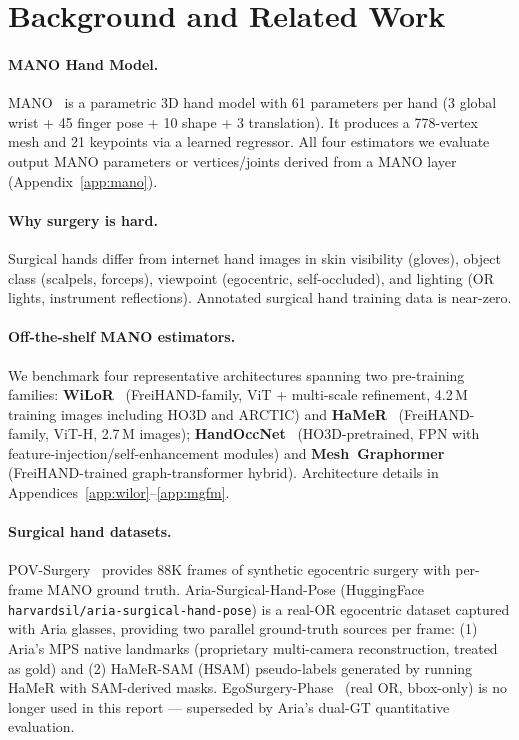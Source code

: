 \documentclass{article}
\begin{document}
\section{Background and Related Work}
\label{sec:background}

\paragraph{MANO Hand Model.}
MANO~\cite{romero2017mano} is a parametric 3D hand model with 61 parameters per hand (3 global wrist + 45 finger pose + 10 shape + 3 translation). It produces a 778-vertex mesh and 21 keypoints via a learned regressor. All four estimators we evaluate output MANO parameters or vertices/joints derived from a MANO layer (Appendix~\ref{app:mano}).

\paragraph{Why surgery is hard.}
Surgical hands differ from internet hand images in skin visibility (gloves), object class (scalpels, forceps), viewpoint (egocentric, self-occluded), and lighting (OR lights, instrument reflections). Annotated surgical hand training data is near-zero.

\paragraph{Off-the-shelf MANO estimators.}
We benchmark four representative architectures spanning two pre-training families:
\textbf{WiLoR}~\cite{potamias2025wilor} (FreiHAND-family, ViT + multi-scale refinement, 4.2\,M training images including HO3D and ARCTIC) and \textbf{HaMeR}~\cite{pavlakos2024hamer} (FreiHAND-family, ViT-H, 2.7\,M images);
\textbf{HandOccNet}~\cite{park2022handoccnet} (HO3D-pretrained, FPN with feature-injection/self-enhancement modules) and \textbf{Mesh~Graphormer}~\cite{lin2021meshgraphormer} (FreiHAND-trained graph-transformer hybrid). Architecture details in Appendices~\ref{app:wilor}–\ref{app:mgfm}.

\paragraph{Surgical hand datasets.}
POV-Surgery~\cite{wang2023povsurgery} provides 88K frames of synthetic egocentric surgery with per-frame MANO ground truth. Aria-Surgical-Hand-Pose (HuggingFace \texttt{harvardsil/aria-surgical-hand-pose}) is a real-OR egocentric dataset captured with Aria glasses, providing two parallel ground-truth sources per frame: (1) Aria's MPS native landmarks (proprietary multi-camera reconstruction, treated as gold) and (2) HaMeR-SAM (HSAM) pseudo-labels generated by running HaMeR with SAM-derived masks. EgoSurgery-Phase~\cite{fujii2024egosurgery} (real OR, bbox-only) is no longer used in this report — superseded by Aria's dual-GT quantitative evaluation.
\end{document}
